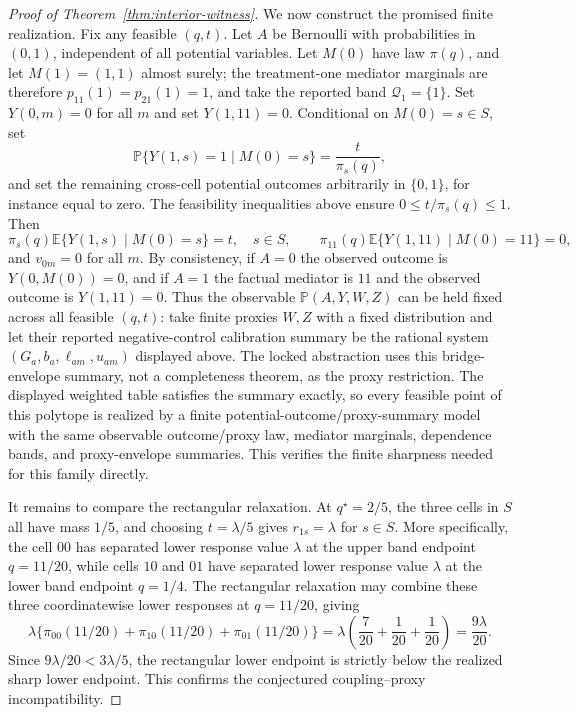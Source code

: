 \documentclass[11pt]{article}
\newcommand{\E}{\mathbb{E}}
\renewcommand{\Pr}{\mathbb{P}}
\theoremstyle{definition}
\theoremstyle{plain}
\theoremstyle{remark}
\begin{document}
\begin{proof}[Proof of Theorem~\ref{thm:interior-witness}]
We now construct the promised finite realization.  Fix any feasible
\((q,t)\).  Let \(A\) be Bernoulli with probabilities in \((0,1)\),
independent of all potential variables.  Let \(M(0)\) have law \(\pi(q)\), and
let \(M(1)=(1,1)\) almost surely; the treatment-one mediator marginals are
therefore \(p_{11}(1)=p_{21}(1)=1\), and take the reported band
\(\mathcal Q_1=\{1\}\).  Set \(Y(0,m)=0\) for all \(m\) and
set \(Y(1,11)=0\).  Conditional on \(M(0)=s\in S\), set
\[
  \Pr\{Y(1,s)=1\mid M(0)=s\}=\frac{t}{\pi_s(q)},
\]
and set the remaining cross-cell potential outcomes arbitrarily in
\(\{0,1\}\), for instance equal to zero.  The feasibility inequalities above
ensure \(0\le t/\pi_s(q)\le1\).  Then
\[
  \pi_s(q)\E\{Y(1,s)\mid M(0)=s\}=t,\quad s\in S,
  \qquad
  \pi_{11}(q)\E\{Y(1,11)\mid M(0)=11\}=0,
\]
and \(v_{0m}=0\) for all \(m\).  By consistency, if \(A=0\) the observed
outcome is \(Y(0,M(0))=0\), and if \(A=1\) the factual mediator is \(11\) and
the observed outcome is \(Y(1,11)=0\).  Thus the observable
\(\Pr(A,Y,W,Z)\) can be held fixed across all feasible \((q,t)\): take finite
proxies \(W,Z\) with a fixed distribution and let their reported
negative-control calibration summary be the rational system
\((G_a,b_a,\ell_{am},u_{am})\) displayed above.  The locked abstraction uses
this bridge-envelope summary, not a completeness theorem, as the proxy
restriction.  The displayed weighted table satisfies the summary exactly, so
every feasible point of this polytope is realized by a finite
potential-outcome/proxy-summary model with the same observable outcome/proxy
law, mediator marginals, dependence bands, and proxy-envelope summaries.  This
verifies the finite sharpness needed for this family directly.

It remains to compare the rectangular relaxation.  At \(q^\star=2/5\), the
three cells in \(S\) all have mass \(1/5\), and choosing
\(t=\lambda/5\) gives \(r_{1s}=\lambda\) for \(s\in S\).  More specifically,
the cell \(00\) has separated lower response value \(\lambda\) at the upper
band endpoint \(q=11/20\), while cells \(10\) and \(01\) have separated lower
response value \(\lambda\) at the lower band endpoint \(q=1/4\).  The
rectangular relaxation may combine these three coordinatewise lower responses
at \(q=11/20\), giving
\[
  \lambda\{\pi_{00}(11/20)+\pi_{10}(11/20)+\pi_{01}(11/20)\}
  =
  \lambda\left(\frac7{20}+\frac1{20}+\frac1{20}\right)
  =
  \frac{9\lambda}{20}.
\]
Since \(9\lambda/20<3\lambda/5\), the rectangular lower endpoint is strictly
below the realized sharp lower endpoint.  This confirms the conjectured
coupling--proxy incompatibility.
\end{proof}
\end{document}
